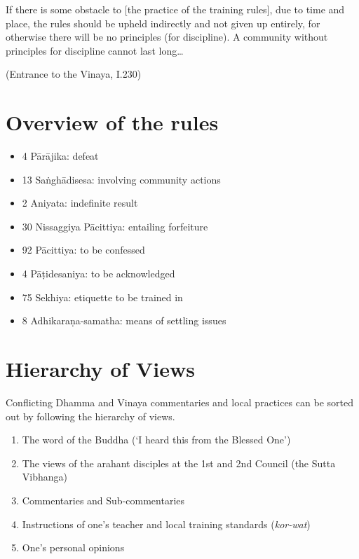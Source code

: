 If there is some obstacle to {[}the practice of the training rules{]},
due to time and place, the rules should be upheld indirectly and not
given up entirely, for otherwise there will be no principles (for
discipline). A community without principles for discipline cannot last
long\ldots{}

(Entrance to the Vinaya, I.230)

\clearpage

\section{Overview of the rules}

\begin{itemize}
\tightlist
\item
  4 Pārājika: defeat
\item
  13 Saṅghādisesa: involving community actions
\item
  2 Aniyata: indefinite result
\item
  30 Nissaggiya Pācittiya: entailing forfeiture
\item
  92 Pācittiya: to be confessed
\item
  4 Pāṭidesaniya: to be acknowledged
\item
  75 Sekhiya: etiquette to be trained in
\item
  8 Adhikaraṇa-samatha: means of settling issues
\end{itemize}

\section{Hierarchy of Views}

Conflicting Dhamma and Vinaya commentaries and local practices can be
sorted out by following the hierarchy of views.

\begin{enumerate}
\def\labelenumi{\arabic{enumi}.}
\tightlist
\item
  The word of the Buddha (`I heard this from the Blessed One')
\item
  The views of the arahant disciples at the 1st and 2nd Council (the
  Sutta Vibhanga)
\item
  Commentaries and Sub-commentaries
\item
  Instructions of one's teacher and local training standards
  (\emph{kor-wat})
\item
  One's personal opinions
\end{enumerate}

